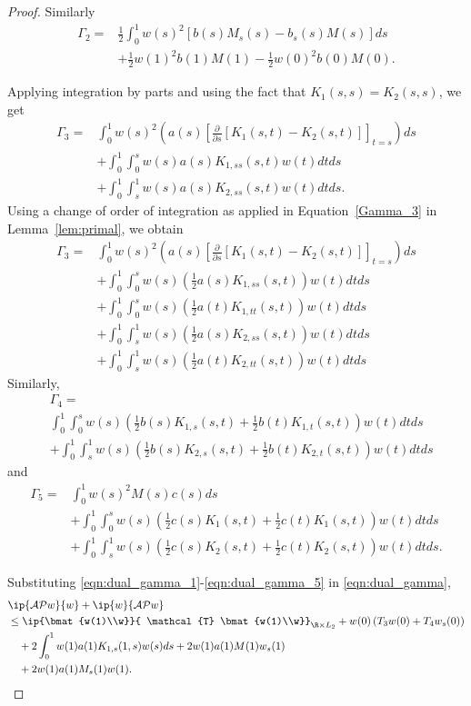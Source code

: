 \documentclass[9pt,journal,twocolumn]{IEEEtran}
\newcommand{\pfs}{\frac{\partial}{\partial s}}
\newcommand{\igzo}{\int_0^1}
\newcommand{\igzs}{\int_0^s}
\newcommand{\igso}{\int_s^1}
\newcommand{\hlf}{\frac{1}{2}}
\begin{document}
\begin{proof}
Similarly
\begin{align}
\Gamma_2 = & \frac{1}{2}\igzo w(s)^2 \left[b(s)M_s(s)-b_s(s)M(s) \right]ds \nonumber \\
&\label{eqn:dual_gamma_2}+\frac{1}{2}w(1)^2 b(1)M(1) -\frac{1}{2}w(0)^2 b(0)M(0).
\end{align}

Applying integration by parts and using the fact that $K_1(s,s)=K_2(s,s)$, we get
\begin{align}
\Gamma_3 = & \igzo w(s)^2 \left(a(s)\left[\pfs[K_1(s,t)-K_2(s,t)] \right]_{t=s} \right)ds \nonumber \\
&+\igzo \igzs w(s)a(s)K_{1,ss}(s,t)w(t)dtds \nonumber \\
&+\igzo \igso w(s)a(s)K_{2,ss}(s,t)w(t)dtds. \nonumber
\end{align} Using a change of order of integration as applied in Equation~\eqref{Gamma_3} in Lemma~\ref{lem:primal}, we obtain
\begin{align}
\Gamma_3 = & \igzo w(s)^2 \left(a(s)\left[\pfs[K_1(s,t)-K_2(s,t)] \right]_{t=s} \right)ds \nonumber \\
&+\igzo \igzs w(s)\left(\hlf a(s)K_{1,ss}(s,t)\right)w(t)dtds \nonumber \\
&+\igzo \igzs w(s)\left(\hlf a(t)K_{1,tt}(s,t)\right)w(t)dtds \nonumber \\
&+\igzo \igso w(s)\left(\hlf a(s)K_{2,ss}(s,t)\right)w(t)dtds \nonumber \\
&\label{eqn:dual_gamma_3}+\igzo \igso w(s)\left(\hlf a(t)K_{2,tt}(s,t)\right)w(t)dtds
\end{align} Similarly,
\begin{align}
&\Gamma_4 = \nonumber \\
 & \igzo \igzs w(s)\left(\hlf b(s)K_{1,s}(s,t)  +\hlf b(t)K_{1,t}(s,t)\right)w(t)dtds \nonumber \\
&\label{eqn:dual_gamma_4}+\igzo \igso w(s)\left(\hlf b(s)K_{2,s}(s,t) +\hlf b(t)K_{2,t}(s,t)\right)w(t)dtds
\end{align} and
\begin{align}
\Gamma_5 = &\igzo w(s)^2 M(s)c(s)ds \nonumber \\
& + \igzo \igzs w(s)\left(\hlf c(s)K_1(s,t)+\hlf c(t)K_1(s,t)\right)w(t)dtds \nonumber \\
&\label{eqn:dual_gamma_5} + \igzo \igso w(s)\left(\hlf c(s)K_2(s,t)+\hlf c(t)K_2(s,t)\right)w(t)dtds.
\end{align}

Substituting \eqref{eqn:dual_gamma_1}-\eqref{eqn:dual_gamma_5} in \eqref{eqn:dual_gamma},
\begin{align}
&\ip{\mathcal{A}\mathcal{P}w}{w}+\ip{w}{\mathcal{A}\mathcal{P}w} \nonumber \\
&\le  \ip{\bmat{w(1)\\w}}{ \mathcal{T} \bmat{w(1)\\w}}_{\R \times L_2}+w(0)\left(T_3 w(0) + T_4 w_s(0) \right) \nonumber \\
&\quad+ 2 \igzo w(1)a(1)K_{1,s}(1,s)w(s)ds+ 2w(1)a(1)M(1)w_s(1) \nonumber \\
&\label{eqn:proof_ineq}\quad+2w(1)a(1)M_s(1)w(1).
\end{align}


\end{proof}
\end{document}
